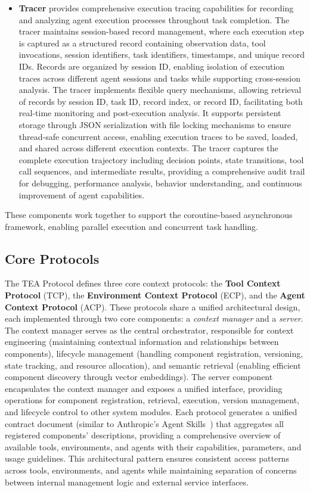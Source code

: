 \documentclass[11pt]{article}
\begin{document}
\begin{itemize}[leftmargin=*,itemsep=0.1em]
\item \textbf{Tracer} provides comprehensive execution tracing capabilities for recording and analyzing agent execution processes throughout task completion. The tracer maintains session-based record management, where each execution step is captured as a structured record containing observation data, tool invocations, session identifiers, task identifiers, timestamps, and unique record IDs. Records are organized by session ID, enabling isolation of execution traces across different agent sessions and tasks while supporting cross-session analysis. The tracer implements flexible query mechanisms, allowing retrieval of records by session ID, task ID, record index, or record ID, facilitating both real-time monitoring and post-execution analysis. It supports persistent storage through JSON serialization with file locking mechanisms to ensure thread-safe concurrent access, enabling execution traces to be saved, loaded, and shared across different execution contexts. The tracer captures the complete execution trajectory including decision points, state transitions, tool call sequences, and intermediate results, providing a comprehensive audit trail for debugging, performance analysis, behavior understanding, and continuous improvement of agent capabilities.

\end{itemize}
These components work together to support the coroutine-based asynchronous framework, enabling parallel execution and concurrent task handling.

\subsection{Core Protocols}

The TEA Protocol defines three core context protocols: the \textbf{Tool Context Protocol} (TCP), the \textbf{Environment Context Protocol} (ECP), and the \textbf{Agent Context Protocol} (ACP). These protocols share a unified architectural design, each implemented through two core components: a \textit{context manager} and a \textit{server}. The context manager serves as the central orchestrator, responsible for context engineering (maintaining contextual information and relationships between components), lifecycle management (handling component registration, versioning, state tracking, and resource allocation), and semantic retrieval (enabling efficient component discovery through vector embeddings). The server component encapsulates the context manager and exposes a unified interface, providing operations for component registration, retrieval, execution, version management, and lifecycle control to other system modules. Each protocol generates a unified contract document (similar to Anthropic's Agent Skills~\citep{anthropic2025agentskills}) that aggregates all registered components' descriptions, providing a comprehensive overview of available tools, environments, and agents with their capabilities, parameters, and usage guidelines. This architectural pattern ensures consistent access patterns across tools, environments, and agents while maintaining separation of concerns between internal management logic and external service interfaces.
\end{document}
